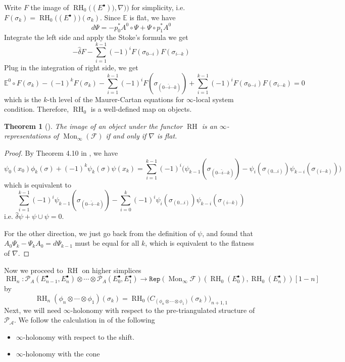 \documentclass[12pt]{amsart}
\newtheorem{thm}{Theorem}[section]
\theoremstyle{definition}
\theoremstyle{remark}
\numberwithin{equation}{section}
\newcommand{\CA}{{\mathcal A}}
\newcommand{\CF}{{\mathcal F}}
\newcommand{\A}{{A}}
\newcommand{\1}{{\mathbb{1}}}
\newcommand{\repi}{\mathtt{Rep}}
\newcommand{\RH}{\operatorname{RH}}
\newcommand{\mon}{\operatorname{Mon}}
\begin{document}
Write $F$ the image of $\RH_0\big((E^{\bullet})), \nabla) \big)$ for simplicity, i.e. $F(\sigma_k) = \RH_0\big((E^{\bullet}))(\sigma_k)$. Since $\mathbb{E}$ is flat, we have 
$$
d\Psi = - p_0^* A^0 \circ \Psi + \Psi \circ p_1^*A^0
$$
Integrate the left side and apply the Stoke's formula we get
\begin{equation*}
    -\hat{\delta}F - \sum_{i=1}^{k-1}(-1)^i F(\sigma_{0\cdots i})F(\sigma_{i\cdots k})
\end{equation*}
Plug in the integration of right side, we get
$$
\mathbb{E}^0\circ F(\sigma_k) - (-1)^k F(\sigma_k) - \sum_{i=1}^{k-1}(-1)^iF(\sigma_{(0\cdots \hat{i}\cdots k)})+\sum_{i=1}^{k-1}(-1)^i F(\sigma_{0\cdots i})F(\sigma_{i\cdots k})=0
$$
which is the $k$-th level of the Maurer-Cartan equations for $\infty$-local system condition. Therefore, $\RH_0$ is a well-defined map on objects.
\begin{thm}[\cite{Igu09}]
	The  image of an object under the functor $\RH$ is an $\infty$-representations of $\mon_{\infty}(\CF)$ if and only if $\nabla$ is flat.
\end{thm}

\begin{proof}
	By Theorem 4.10 in \cite{Igu09}, we have
	$$
	\psi_0(x_0)\phi_k(\sigma) + (-1)^k\psi_k(\sigma)\psi(x_k) = \sum_{i=1}^{k-1}(-1)^i\big(\psi_{k-1}(\sigma_{(0\cdots \hat{i}\cdots k)}) - \psi_i(\sigma_{(0\dots i)})\psi_{k-i}(\sigma_{(i\cdots k)})\big)
	$$
	which is equivalent to 
	$$
	 \sum_{i=1}^{k-1}(-1)^i \psi_{k-1}(\sigma_{(0\cdots \hat{i}\cdots k)}) - \sum_{i=0}^k  (-1)^i \psi_i(\sigma_{(0\dots i)})\psi_{k-i}(\sigma_{(i\cdots k)})
	$$
	i.e. $\hat{\delta}\psi + \psi\cup\psi = 0$.  
	
	For the other direction, we just go back from the definition of $\psi$, and found that $A_0 \Psi_k - \Psi_k A_0 = d\Psi_{k-1}$ must be equal for all $k$, which is equivalent to the flatness of $\nabla$.
	\end{proof}
	
	Now we proceed to $\RH$ on higher simplices 
$$
\RH_n: \mathcal{P}_{\A}(E_{n-1}^{\bullet}, E_n^{\bullet}) \otimes \cdots \otimes \mathcal{P}_{\A}(E_{0}^{\bullet}, E_1^{\bullet}) \to \repi(\mon_{\infty}\CF)(\RH_0(E_0^{\bullet}), \RH_0(E_n^{\bullet}))[1-n]
$$
by
\begin{equation}
\RH_n (\phi_n \otimes \cdots \otimes \phi_1)(\sigma_k) = \RH_0\big(C_{(\phi_n \otimes \cdots \otimes \phi_1)}(\sigma_k) \big)_{n+1,1}
\end{equation}
Next, we will need $\infty$-holonomy with respect to the pre-triangulated structure of $\mathcal{P}_{\CA}$. We follow the calculation in \cite[Section 3.5]{BS14}
of the following 
\begin{itemize}
    \item $\infty$-holonomy with respect to the shift.
    \item $\infty$-holonomy with the cone
\end{itemize}
\end{document}
